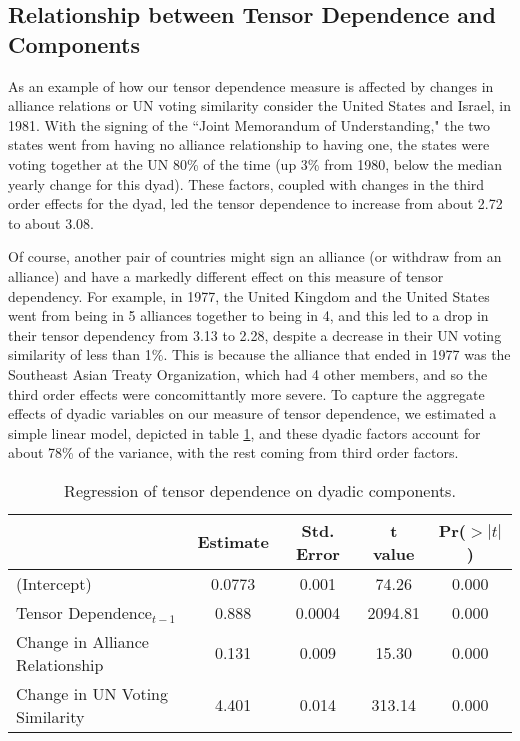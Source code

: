 \subsection*{Relationship between Tensor Dependence and Components}

As an example of how our tensor dependence measure is affected by changes in alliance relations or UN voting similarity consider the United States and Israel, in 1981. With the signing of the ``Joint Memorandum of Understanding," the two states went from having no alliance relationship to having one, the states were voting together at the UN 80\% of the time (up 3\% from 1980, below the median yearly change for this dyad). These factors, coupled with changes in the third order effects for the dyad, led the tensor dependence to increase from about 2.72 to about 3.08. 

Of course, another pair of countries might sign an alliance (or withdraw from an alliance) and have a markedly different effect on this measure of tensor dependency. For example, in 1977, the United Kingdom and the United States went from being in 5 alliances together to being in 4, and this led to a drop in their tensor dependency from 3.13 to 2.28, despite a decrease in their UN voting similarity of less than 1\%. This is because the alliance that ended in 1977 was the Southeast Asian Treaty Organization, which had 4 other members, and so the third order effects were concomittantly more severe. To capture the aggregate effects of dyadic variables on our measure of tensor dependence, we estimated a simple linear model, depicted in table \ref{tensor:ols}, and these dyadic factors account for about 78\% of the variance, with the rest coming from third order factors. 

\begin{table}[ht]
	\centering
	\begin{tabular}{lcccc}
		\hline
		& Estimate & Std. Error & t value & Pr($>|t|$) \\ 
		\hline
		(Intercept) & 0.0773 & 0.001 & 74.26 & 0.000 \\ 
		Tensor Dependence$_{t-1}$ & 0.888 & 0.0004 & 2094.81 & 0.000 \\ 
		Change in Alliance Relationship & 0.131 & 0.009 & 15.30 & 0.000 \\ 
		Change in UN Voting Similarity & 4.401 & 0.014 & 313.14 & 0.000 \\ 
		\hline
	\end{tabular}
	\label{tensor:ols}
	\caption{Regression of tensor dependence on dyadic components.}
\end{table}

